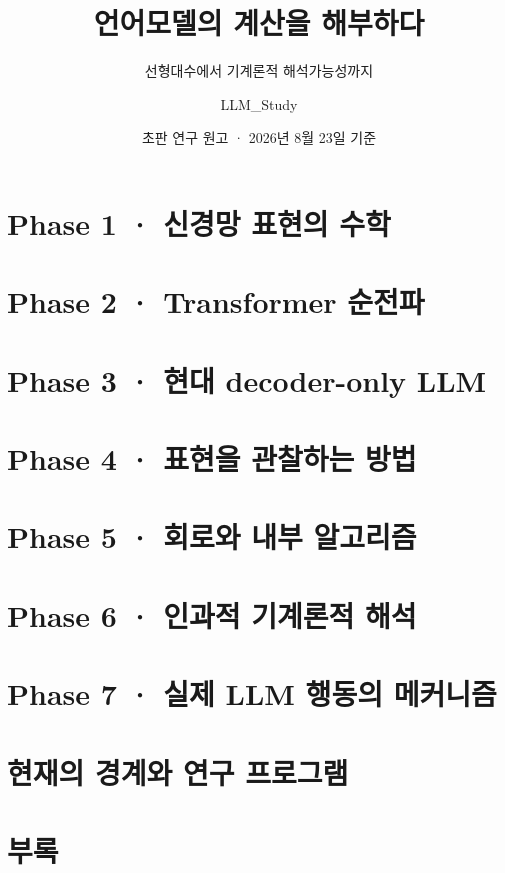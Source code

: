 \documentclass[11pt,oneside,openany]{scrbook}
\title{언어모델의 계산을 해부하다}
\subtitle{선형대수에서 기계론적 해석가능성까지}
\author{LLM\_Study}
\date{초판 연구 원고 · 2026년 8월 23일 기준}
\begin{document}
\frontmatter
\maketitle



\tableofcontents
\listoffigures
\listoftables

\mainmatter

\part{Phase 1 · 신경망 표현의 수학}


\part{Phase 2 · Transformer 순전파}


\part{Phase 3 · 현대 decoder-only LLM}


\part{Phase 4 · 표현을 관찰하는 방법}


\part{Phase 5 · 회로와 내부 알고리즘}


\part{Phase 6 · 인과적 기계론적 해석}


\part{Phase 7 · 실제 LLM 행동의 메커니즘}


\part{현재의 경계와 연구 프로그램}


\appendix
\part{부록}





\backmatter


\printindex
\end{document}
